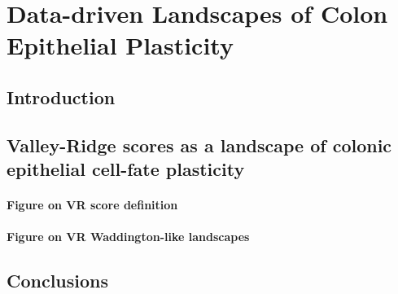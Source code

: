 \chapter{Data-driven Landscapes of Colon Epithelial Plasticity}
\label{05vr}

\section{Introduction}

\section{Valley-Ridge scores as a landscape of colonic epithelial cell-fate plasticity}

\subsubsection{Figure on VR score definition}

\subsubsection{Figure on VR Waddington-like landscapes}

\section{Conclusions}





